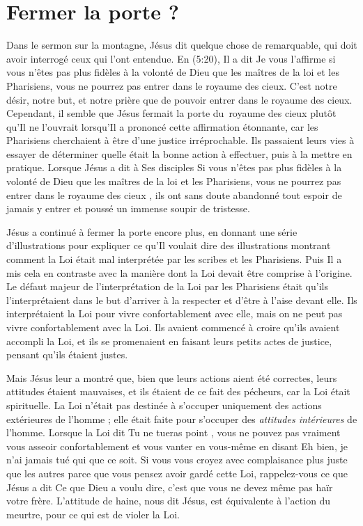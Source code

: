 \section{Fermer la porte ?}

Dans le sermon sur la montagne, Jésus dit quelque chose de remarquable,
 qui doit avoir interrogé ceux qui l'ont entendue.
 En (5:20), Il a dit\frcolon{}
 \Og Je vous l'affirme\frcolon{}
 si vous n'êtes pas plus fidèles à la volonté de Dieu
 que les maîtres de la loi et les Pharisiens,
 vous ne pourrez pas entrer dans le royaume des cieux. \Fg{}
 C'est notre désir, notre but, et notre prière que de pouvoir entrer
 dans le royaume des cieux.
 Cependant, il semble que Jésus fermait la porte du~royaume des cieux
 plutôt qu'Il ne l'ouvrait lorsqu'Il a prononcé cette affirmation étonnante,
 car les Pharisiens cherchaient à être d'une justice irréprochable.
 Ils passaient leurs vies à essayer de déterminer quelle était
 la bonne action à effectuer,
 puis à la mettre en pratique.
 Lorsque Jésus a dit à Ses disciples\frcolon{}
 \Og Si vous n'êtes pas plus fidèles à la volonté de Dieu que
 les maîtres de la loi et les Pharisiens, vous ne pourrez pas
 entrer dans le royaume des cieux \Fg{},
 ils ont sans doute abandonné tout espoir de jamais y entrer
 et poussé un immense soupir de tristesse.

Jésus a continué à fermer la porte encore plus,
 en donnant une série d'illustrations pour expliquer
 ce qu'Il voulait dire \ocadr des illustrations montrant comment la Loi
 était mal interprétée par les scribes et les Pharisiens.
 Puis Il a mis cela en contraste avec la manière dont la Loi
 devait être comprise à l'origine.
 Le défaut majeur de l'interpré\-ta\-tion de la Loi par les Pharisiens
 était qu'ils l'interprétaient dans le but d'arriver à la respecter
 et d'être à l'aise devant elle.
 Ils interprétaient la Loi pour vivre confortablement avec elle,
 mais on ne peut pas vivre confortablement avec la Loi.
 Ils avaient commencé à croire qu'ils avaient accompli la Loi,
 et ils se promenaient en faisant leurs petits actes de justice,
 pensant qu'ils étaient justes.

Mais Jésus leur a montré que, bien que leurs actions
 aient été correctes, leurs attitudes étaient mauvaises,
 et ils étaient de ce fait des pécheurs,
 car la Loi était spirituelle.
 La Loi n'était pas destinée à s'occuper uniquement des actions extérieures
 de l'homme ; elle était faite pour s'occuper
 des \emph{attitudes intérieures} de l'homme.
 Lorsque la Loi dit\frcolon{} \Og Tu ne tueras point \Fg{},
 vous ne pouvez pas vraiment vous asseoir confortablement et vous vanter
 en vous-même en disant\frcolon{}
 \Og Eh bien, je n'ai jamais tué qui que ce soit. \Fg{}
 Si vous vous croyez avec complaisance plus juste que les autres parce que vous pensez
 avoir gardé cette Loi, rappelez-vous ce que Jésus a dit\frcolon{}
 \Og Ce que Dieu a voulu dire, c'est que vous ne devez même pas
 haïr votre frère. \Fg{}
 L'attitude de haine, nous dit Jésus,
 est équivalente à l'action du meurtre,
 pour ce qui est de violer la Loi.

